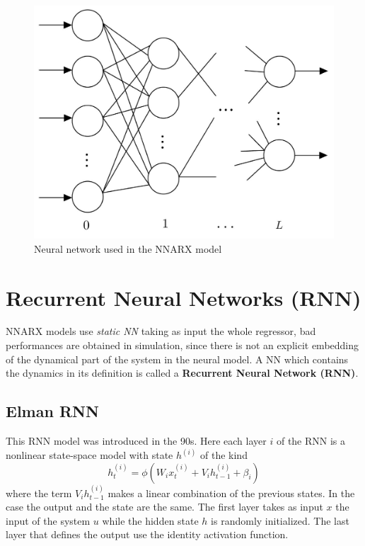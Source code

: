 \begin{figure}[h]
    \centering
    \includegraphics[scale=0.2]{img/NNARX.jpeg}
    \caption{Neural network used in the NNARX model}    
\end{figure}

\section{Recurrent Neural Networks (RNN)}
NNARX models use \textit{static NN} taking as input the whole regressor, bad performances are obtained in simulation, since there is not an explicit embedding of the dynamical part of the system in the neural model. A NN which contains the dynamics in its definition is called a \textbf{Recurrent Neural Network (RNN)}.

\subsection{Elman RNN}
This RNN model was introduced in the 90s. Here each layer $i$ of the RNN is a nonlinear state-space model with state $h^{(i)}$ of the kind
\begin{equation*}
    h_t^{(i)}=\phi(W_i x_t^{(i)} + V_i h_{t-1}^{(i)} + \beta_i)
\end{equation*}
where the term $V_i h_{t-1}^{(i)}$ makes a linear combination of the previous states. In the case the output and the state are the same. The first layer takes as input $x$ the input of the system $u$ while the hidden state $h$ is randomly initialized. The last layer that defines the output use the identity activation function.


